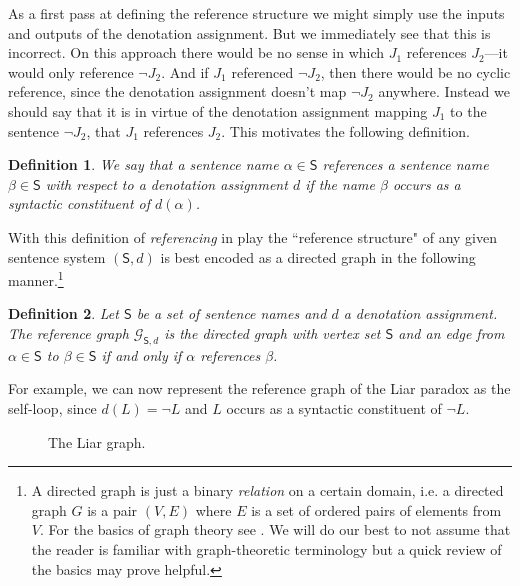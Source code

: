 \documentclass[12pt]{kluwer}
\newtheorem{defn}{Definition}
\theoremstyle{remark}
\newcommand{\fancy}[1]{\mathcal{#1}}
\def\S{\textsf{S}}
\def\G{\fancy{G}}
\begin{document}
As a first pass at defining the reference structure we might simply use the inputs and outputs of the denotation assignment. But we immediately see that this is incorrect. On this approach there would be no sense in which $J_1$ references $J_2$---it would only reference $\neg J_2$. And if $J_1$ referenced $\neg J_2$, then there would be no cyclic reference, since the denotation assignment doesn't map $\neg J_2$ anywhere. Instead we should say that it is in virtue of the denotation assignment mapping $J_1$ to the sentence $\neg J_2$, that $J_1$ references $J_2$. This motivates the following definition.

\begin{defn} We say that a sentence name $\alpha \in \S$ \emph{references} a sentence name $\beta\in \S$ with respect to a denotation assignment $d$ if the name $\beta$ occurs as a syntactic constituent of $d(\alpha)$. 
\end{defn}

With this definition of \textit{referencing}  in play the ``reference structure"  of any given sentence system $(\S,d)$ is best encoded as a directed graph in the following manner.\footnote{A directed graph is just a binary \textit{relation} on a certain domain, i.e. a directed graph $G$ is a pair $(V, E)$ where $E$ is a set of ordered pairs of elements from $V$. For the basics of graph theory see \cite{diestel2010}. We will do our best to not assume that the reader is familiar with graph-theoretic terminology but a quick review of the basics may prove helpful.}

\begin{defn}
Let $\S$ be a set of sentence names and $d$ a denotation assignment.  The \emph{reference graph} $\G_{\S, d}$ is the directed graph with vertex set $\S$ and an edge from $\alpha \in \S$ to $\beta \in \S$ if and only if $\alpha$ references $\beta$.
\end{defn}


For example, we can now represent the reference graph of the Liar paradox as the self-loop, since $d(L) = \neg L$ and $L$ occurs as a syntactic constituent of $\neg L$.



\begin{figure}[ht]
\centering


\caption{The Liar graph.}
\end{figure}
\end{document}
